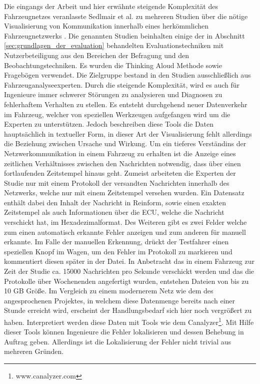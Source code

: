 \documentclass[draft=false
              ,paper=a4
              ,twoside=false
              ,fontsize=11pt
              ,headsepline
              ,BCOR10mm
              ,DIV11
              ]{scrbook}
\newcommand{\TODO}[1]{\colorbox{yellow}{\textcolor{red}{[TODO: #1]}}}
\begin{document}
Die eingangs der Arbeit und hier erwähnte steigende Komplexität des Fahrzeugnetzes veranlasste Sedlmair et al. zu mehreren Studien über die nötige Visualisierung von Kommunikation innerhalb eines herkömmlichen Fahrzeugnetzwerks \cite{sedlmair2009}\cite{sedlmair_dual-view_2008}. Die genannten Studien beinhalten einige der in Abschnitt \ref{sec:grundlagen_der_evaluation} behandelten Evaluationstechniken mit Nutzerbeteiligung aus den Bereichen der Befragung und den Beobachtungstechniken. Es wurden die Thinking Aloud Methode sowie Fragebögen verwendet. Die Zielgruppe bestand in den Studien ausschließlich aus Fahrzeuganalyseexperten. Durch die steigende Komplexität, wird es auch für Ingenieure immer schwerer Störungen zu analysieren und Diagnosen zu fehlerhaftem Verhalten zu stellen. Es entsteht durchgehend neuer Datenverkehr im Fahrzeug, welcher von speziellen Werkzeugen aufgefangen wird um die Experten zu unterstützen. Jedoch beschreiben diese Tools die Daten hauptsächlich in textueller Form, in dieser Art der Visualisierung fehlt allerdings die Beziehung zwischen Ursache und Wirkung. Um ein tieferes Verständins der Netzwerkommunikation in einem Fahrzeug zu erhalten ist die Anzeige eines zeitlichen Verhältnisses zwischen den Nachrichten notwendig, dass über einen fortlaufenden Zeitstempel hinaus geht. Zumeist arbeiteten die Experten der Studie nur mit einem Protokoll der versandten Nachrichten innerhalb des Netzwerks, welche nur mit einem Zeitstempel versehen wurden. Ein Datensatz enthält dabei den Inhalt der Nachricht in Reinform, sowie einen exakten Zeitstempel als auch Informationen über die ECU, welche die Nachricht verschickt hat, im Hexadezimalformat. Des Weiteren gibt es zwei Felder welche zum einen automatisch erkannte Fehler anzeigen und zum anderen für manuell erkannte. Im Falle der manuellen Erkennung, drückt der Testfahrer einen speziellen Knopf im Wagen, um den Fehler im Protokoll zu markieren und kommentiert diesen später in der Datei. In Anbetracht das in einem Fahrzeug zur Zeit der Studie ca. 15000 Nachrichten pro Sekunde verschickt werden und das die Protokolle über Wochenenden angefertigt wurden, entstehen Dateien von bis zu 10 GB Größe. Im Vergleich zu einem modernerem Netz wie dem des angesprochenen Projektes, in welchem diese Datenmenge bereits nach einer Stunde erreicht wird, erscheint der Handlungsbedarf sich hier noch vergrößert zu haben. Interpretiert werden diese Daten mit Tools wie dem Canalyzer\footnote{www.canalyzer.com}. Mit Hilfe dieser Tools können Ingenieure die Fehler lokalisieren und dessen Behebung in Auftrag geben. Allerdings ist die Lokalisierung der Fehler nicht trivial aus mehreren Gründen. 
\end{document}
